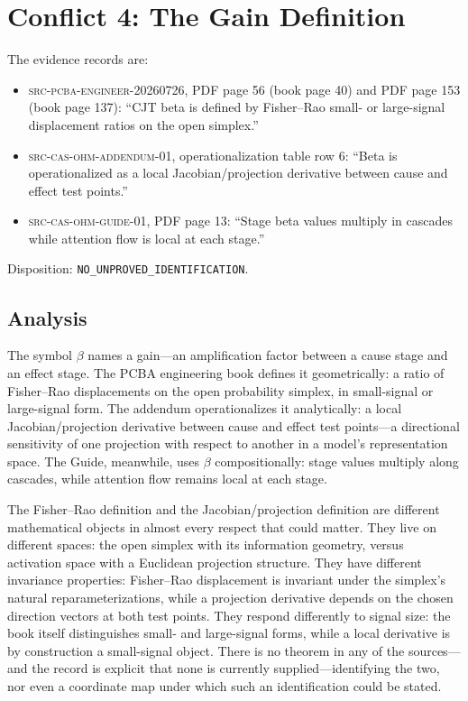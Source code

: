 \section{Conflict 4: The Gain Definition}\label{ch04:gain}

\begin{conflict}\label{ch04:conf:gain}
The evidence records are:
\begin{itemize}
\item \textsc{src-pcba-engineer-20260726}, PDF page 56 (book page 40) and PDF
page 153 (book page 137): ``CJT beta is defined by Fisher--Rao small- or
large-signal displacement ratios on the open simplex.''
\item \textsc{src-cas-ohm-addendum-01}, operationalization table row 6:
``Beta is operationalized as a local Jacobian/projection derivative between
cause and effect test points.''
\item \textsc{src-cas-ohm-guide-01}, PDF page 13: ``Stage beta values
multiply in cascades while attention flow is local at each stage.''
\end{itemize}
Disposition: \texttt{NO\_UNPROVED\_IDENTIFICATION}.
\end{conflict}

\subsection{Analysis}

The symbol $\beta$ names a gain---an amplification factor between a cause
stage and an effect stage. The PCBA engineering book defines it
geometrically: a ratio of Fisher--Rao displacements on the open probability
simplex, in small-signal or large-signal form. The addendum operationalizes
it analytically: a local Jacobian/projection derivative between cause and
effect test points---a directional sensitivity of one projection with respect
to another in a model's representation space. The Guide, meanwhile, uses
$\beta$ compositionally: stage values multiply along cascades, while
attention flow remains local at each stage.

The Fisher--Rao definition and the Jacobian/projection definition are
different mathematical objects in almost every respect that could matter.
They live on different spaces: the open simplex with its information
geometry, versus activation space with a Euclidean projection structure. They
have different invariance properties: Fisher--Rao displacement is invariant
under the simplex's natural reparameterizations, while a projection
derivative depends on the chosen direction vectors at both test points. They
respond differently to signal size: the book itself distinguishes small- and
large-signal forms, while a local derivative is by construction a
small-signal object. There is no theorem in any of the sources---and the
record is explicit that none is currently supplied---identifying the two, nor
even a coordinate map under which such an identification could be stated.

